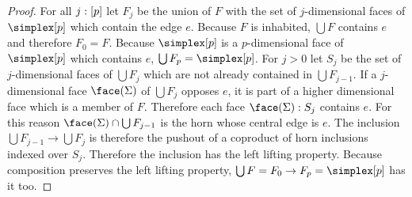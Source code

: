 \documentclass[csh.tex]{subfiles}
\begin{document}
\begin{proof} For all $j:[p]$ let $F_j$ be the union of $F$ with the set of $j$-dimensional faces of $\simplex[p]$ which contain the edge $e$. Because $F$ is inhabited, $\bigcup F$ contains $e$ and therefore $F_0=F$. Because $\simplex[p]$ is a $p$-dimensional face of $\simplex[p]$ which contains $e$, $\bigcup F_p = \simplex[p]$. For $j>0$ let $S_j$ be the set of $j$-dimensional faces of $\bigcup F_j$ which are not already contained in $\bigcup F_{j-1}$. If a $j$-dimensional face $\face(\Sigma)$ of $\bigcup F_j$ opposes $e$, it is part of a higher dimensional face which is a member of $F$. Therefore each face $\face(\Sigma)\of S_j$ contains $e$. For this reason $\face(\Sigma)\cap \bigcup F_{j-1}$ is the horn whose central edge is $e$. The inclusion $\bigcup F_{j-1}\to\bigcup F_j$ is therefore the pushout of a coproduct of horn inclusions indexed over $S_j$. Therefore the inclusion has the left lifting property. Because composition preserves the left lifting property, $\bigcup F = F_0\to F_p = \simplex[p]$ has it too. 
\end{proof}
\end{document}
